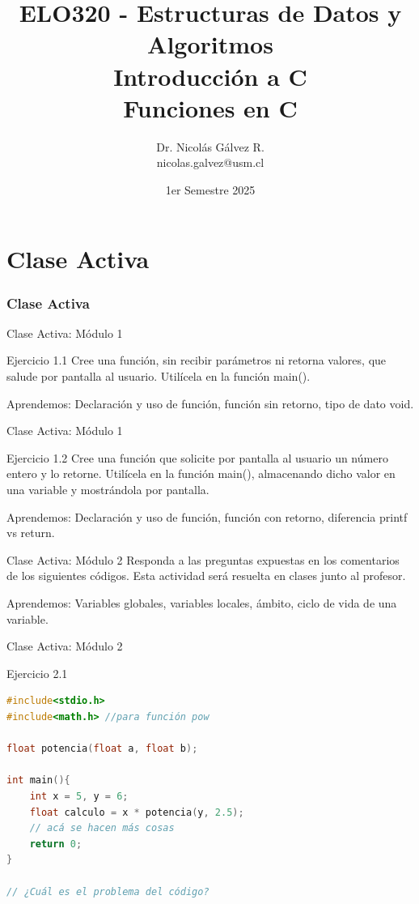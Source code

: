 \documentclass{beamer}
\title{ELO320 - Estructuras de Datos y Algoritmos\\Introducción a C\\Funciones en C}
\author{Dr. Nicolás Gálvez R.\\{\small nicolas.galvez@usm.cl}}
\institute{Ing. Civil Telemática - Departamento de Electrónica}
\date{1er Semestre 2025}
\begin{document}
\frame{\titlepage}

%
%
\part{Clase Activa}
\section{Clase Activa}
\begin{frame}[fragile]{Clase Activa: Módulo 1}
\begin{exampleblock}{Ejercicio 1.1}
Cree una función, sin recibir parámetros ni retorna valores, que salude por pantalla al usuario. Utilícela en la función main().
\end{exampleblock}

{\tiny Aprendemos: Declaración y uso de función, función sin retorno, tipo de dato void.}
\end{frame}

\begin{frame}[fragile]{Clase Activa: Módulo 1}
\begin{exampleblock}{Ejercicio 1.2}
Cree una función que solicite por pantalla al usuario un número entero y lo retorne. Utilícela en la función main(), almacenando dicho valor en una variable y mostrándola por pantalla.
\end{exampleblock}

{\tiny Aprendemos: Declaración y uso de función, función con retorno, diferencia printf vs return.}
\end{frame}

\begin{frame}[fragile]{Clase Activa: Módulo 2}
Responda a las preguntas expuestas en los comentarios de los siguientes códigos. Esta actividad será resuelta en clases junto al profesor. 

{\tiny Aprendemos: Variables globales, variables locales, ámbito, ciclo de vida de una variable.}
\end{frame}


\begin{frame}[fragile]{Clase Activa: Módulo 2}
\begin{exampleblock}{Ejercicio 2.1}
\begin{lstlisting}[language=C, basicstyle=\scriptsize]
#include<stdio.h>
#include<math.h> //para función pow

float potencia(float a, float b);

int main(){
	int x = 5, y = 6;
	float calculo = x * potencia(y, 2.5);
	// acá se hacen más cosas
	return 0;
}

// ¿Cuál es el problema del código?
\end{lstlisting}
\end{exampleblock}

\end{frame}
\end{document}
